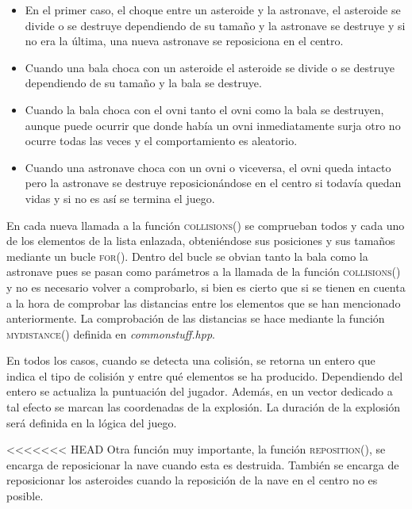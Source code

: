 \begin{itemize}
    \item En el primer caso, el choque entre un asteroide y la astronave, el asteroide se divide o se destruye dependiendo de su tamaño y la astronave se destruye y si no era la última, una nueva astronave se reposiciona en el centro.
    \item Cuando una bala choca con un asteroide el asteroide se divide o se destruye dependiendo de su tamaño y la bala se destruye.
    \item Cuando la bala choca con el ovni tanto el ovni como la bala se destruyen, aunque puede ocurrir que donde había un ovni inmediatamente surja otro no ocurre todas las veces y el comportamiento es aleatorio.
    \item Cuando una astronave choca con un ovni o viceversa, el ovni queda intacto pero la astronave se destruye reposicionándose en el centro si todavía quedan vidas y si no es así se termina el juego.
\end{itemize}

En cada nueva llamada a la función \textsc{collisions()} se comprueban todos y cada uno de los elementos de la lista enlazada, obteniéndose sus posiciones y sus tamaños mediante un bucle \textsc{for()}. Dentro del bucle se obvian tanto la bala como la astronave pues se pasan como parámetros a la llamada de la función \textsc{collisions()} y no es necesario volver a comprobarlo, si bien es cierto que si se tienen en cuenta a la hora de comprobar las distancias entre los elementos que se han mencionado anteriormente. La comprobación de las distancias se hace mediante la función \textsc{mydistance()} definida en \emph{commonstuff.hpp}.

En todos los casos, cuando se detecta una colisión, se retorna un entero que indica el tipo de colisión y entre qué elementos se ha producido. Dependiendo del entero se actualiza la puntuación del jugador.  Además, en un vector dedicado a tal efecto se marcan las coordenadas de la explosión. La duración de la explosión será definida en la lógica del juego.

<<<<<<< HEAD
Otra función muy importante, la función \textsc{reposition()}, se encarga de reposicionar la nave cuando esta es destruida. También se encarga de reposicionar los asteroides cuando la reposición de la nave en el centro no es posible.

